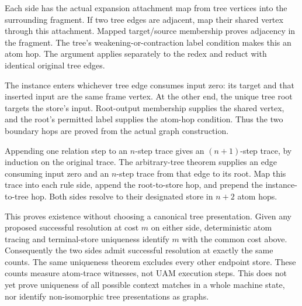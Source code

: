 Each side has the actual expansion attachment map from tree vertices into
the surrounding fragment. If two tree edges are adjacent, map their shared
vertex through this attachment. Mapped target/source membership proves
adjacency in the fragment. The tree's weakening-or-contraction label condition
makes this an atom hop. The argument applies separately to the redex and
reduct with identical original tree edges.

The instance enters whichever tree edge consumes input zero: its target and
that inserted input are the same frame vertex. At the other end, the unique
tree root targets the store's input. Root-output membership supplies the shared
vertex, and the root's permitted label supplies the atom-hop condition. Thus
the two boundary hops are proved from the actual graph construction.









Appending one relation step to an $n$-step trace gives an $(n+1)$-step
trace, by induction on the original trace. The arbitrary-tree theorem supplies
an edge consuming input zero and an $n$-step trace from that edge to its root.
Map this trace into each rule side, append the root-to-store hop, and prepend
the instance-to-tree hop. Both sides resolve to their designated store in
$n+2$ atom hops.

This proves existence without choosing a canonical tree presentation. Given
any proposed successful resolution at cost $m$ on either side, deterministic
atom tracing and terminal-store uniqueness identify $m$ with the common cost
above. Consequently the two sides admit successful resolution at exactly the
same counts. The same uniqueness theorem excludes every other endpoint store.
These counts measure atom-trace witnesses, not UAM execution steps. This does
not yet prove uniqueness of all possible context matches in a whole machine
state, nor identify non-isomorphic tree presentations as graphs.

